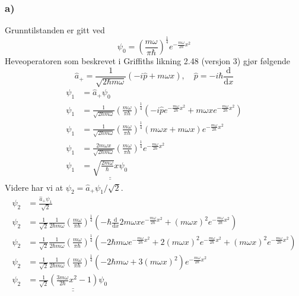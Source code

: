 \documentclass{article}
\begin{document}
\subsubsection*{a)}
Grunntilstanden er gitt ved 
\begin{equation}
ψ_0 = \left(\frac{mω}{πℏ}\right)^{\frac{1}{4}} e^{-\frac{mω}{2ℏ}x^2} \label{eq:psi0}
\end{equation}
Heveoperatoren som beskrevet i Griffiths likning 2.48 (versjon 3) gjør følgende
\begin{equation}\label{eq: a_+}
\hat{a}_{+} = \frac{1}{\sqrt{2ℏmω}} \left(- i\hat{p} + mωx\right), \quad \hat{p} = -iℏ \frac{\mathrm{d}}{\mathrm{d}x}
\end{equation}
\begin{align*}
ψ_1 &= \hat{a}_{+} ψ_0 
\\
ψ_1 &= \frac{1}{\sqrt{2ℏmω}} \left(\frac{mω}{πℏ}\right)^{\frac{1}{4}} \left(-i\hat{p}e^{-\frac{mω}{2ℏ}x^2} + mωx e^{-\frac{mω}{2ℏ}x^2}\right) 
\\
ψ_1 &=\frac{1}{\sqrt{2ℏmω}}\left(\frac{mω}{πℏ}\right)^{\frac{1}{4}} \left(mωx + mωx\right) e^{-\frac{mω}{2ℏ}x^2} \\ 
ψ_1 &= \frac{2mωx}{\sqrt{2ℏmω}}\left(\frac{mω}{πℏ}\right)^{\frac{1}{4}} e^{-\frac{mω}{2ℏ}x^2} 
\\
ψ_1 &= \underline{\underline{\sqrt{\frac{2mω}{ℏ}}x ψ_0}}
\end{align*}
Videre har vi at $ψ_2 = \hat{a}_{+}ψ_1 / \sqrt{2}$. 
\begin{align*}
ψ_2 &= \frac{\hat{a}_{+} ψ_1}{\sqrt{2}}
\\
ψ_2 &= \frac{1}{\sqrt{2}} \frac{1}{2ℏmω} \left(\frac{mω}{πℏ}\right)^{\frac{1}{4}}\left(-ℏ \frac{\mathrm{d}}{\mathrm{d}x}2mωx e^{-\frac{mω}{2ℏ}x^2} + (mωx)^2 e^{- \frac{mω}{2ℏ}x^2}\right)
\\
ψ_2 &= \frac{1}{\sqrt{2}} \frac{1}{2ℏmω} \left(\frac{mω}{πℏ}\right)^{\frac{1}{4}} \left(-2ℏmωe^{-\frac{mω}{2ℏ}x^2} + 2(mωx)^2 e^{- \frac{mω}{2ℏ}x^2} + (mωx)^2 e^{- \frac{mω}{2ℏ}x^2}\right)
\\
ψ_2 &= \frac{1}{\sqrt{2}} \frac{1}{2ℏmω} \left(\frac{mω}{πℏ}\right)^{\frac{1}{4}}\left(-2ℏmω + 3(mωx)^2\right)e^{- \frac{mω}{2ℏ}x^2}
\\
ψ_2 &= \underline{\underline{\frac{1}{\sqrt{2}} \left( \frac{3mω}{2ℏ}x^2 - 1\right)ψ_0}}
\end{align*}
\end{document}

